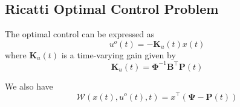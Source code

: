 \documentclass[11pt,draftd]{article}
\begin{document}
\begin{appendices}
	\subsection{Ricatti Optimal Control Problem}
	The optimal control can be expressed as
	\begin{equation}
	u^{o}(t) = -\mathbf{K}_{u}(t)x(t)
	\end{equation}
	where $ \mathbf{K}_{u}(t) $ is a time-varying gain given by
	\begin{equation} 
	\mathbf{K}_{u}(t) = \mathbf{\Phi}^{-1}\mathbf{B}^{\intercal}\mathbf{P}(t)
	\end{equation}
	
	We also have 
	\begin{equation}
	\mathcal{W}(x(t), u^{o}(t), t) = x^{\intercal}\left(	\mathbf{\Psi}-\mathbf{P}(t)		\right)
	\end{equation}
\end{appendices}
\end{document}
